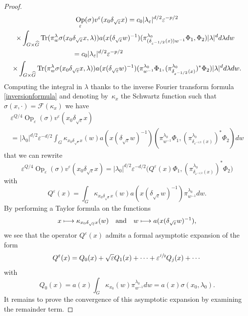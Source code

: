 \documentclass[JEP,XML,SOM,Unicode,published]{cedram}
\let\mathcal\mathscr
\newcommand\mto{\mathchoice{\longmapsto}{\mapsto}{\mapsto}{\mapsto}}
\DeclareMathOperator{\Op}{Op}
\DeclareMathOperator{\Tr}{Tr}
\theoremstyle{plain}
\theoremstyle{definition}
\let\eps\varepsilon
\begin{document}
\begin{proof}
\begin{multline*}
\Op_\eps(\sigma) v^\eps(x_0\delta_{\sqrt\eps}x)
= c_0 |\lambda_\eps|^{d/2}\eps^{-p/2} \\
\shoveright{\times \int_{G\times \widehat G} \Tr (\pi^{\lambda}_{w }\sigma(x_0\delta_{\sqrt\eps} x,\lambda))
a(x (\delta_{\sqrt\eps} w)^{-1}) (\pi_{ (\delta_{\eps^{-1/2}} (x))w^{-1} }^{\lambda_0} \Phi_1, \Phi_2) |\lambda|^d d\lambda dw}\\
\shoveleft{\hphantom{\Op_\eps(\sigma) v^\eps(x_0\delta_{\sqrt\eps}x)}\, =c_0 |\lambda_\eps|^{d/2}\eps^{-p/2}} \\
\times \int_{G\times \widehat G} \Tr (\pi^{\lambda}_{w }\sigma(x_0\delta_{\sqrt\eps} x,\lambda))
a(x (\delta_{\sqrt\eps} w)^{-1})
(\pi_{ w^{-1} }^{\lambda_0} \Phi_1,
(\pi^{\lambda_0}_{\delta_{\eps^{-1/2} }(x)})^*\Phi_2) |\lambda|^d d\lambda dw.
\end{multline*}
Computing the integral in $\lambda$ thanks to the inverse Fourier transform formula \eqref{inversionformula} and denoting by~$\kappa_x$ the Schwartz function such that $\sigma(x,\cdot)=
\mathcal F(\kappa_x)$ we have
\begin{multline*}
\eps^{Q/4} \Op_\eps(\sigma) v^\eps(x_0\delta_{\sqrt\eps}x)\\
= |\lambda_0|^{d/2}\eps^{-d/2} \int_{G} \kappa_{x_0\delta_{\sqrt\eps} x}(w)
a(x (\delta_{\sqrt\eps} w)^{-1})
(\pi_{ w^{-1} }^{\lambda_0} \Phi_1,
(\pi^{\lambda_0}_{\delta_{\eps^{-1/2} }(x)})^*\Phi_2) dw
\end{multline*}
that we can rewrite
\[
\eps^{Q/4} \Op_\eps(\sigma) v^\eps(x_0\delta_{\sqrt\eps}x)
= |\lambda_0|^{d/2}\eps^{-d/2} \bigl(Q^\eps(x) \Phi_1,
(\pi^{\lambda_0}_{\delta_{\eps^{-1/2} }(x)})^*\Phi_2\bigr)
\]
with
\[
Q^\eps(x)=
\int_{G} \kappa_{x_0\delta_{\sqrt\eps} x}(w)
a(x (\delta_{\sqrt\eps} w)^{-1})
\pi_{ w^{-1} }^{\lambda_0} dw.
\]
By performing a Taylor formula on the functions
\[
x\mto \kappa_{x_0\delta_{\sqrt\eps} x}(w)\quad\text{and}\quad w \mto a(x (\delta_{\sqrt\eps} w)^{-1}) ,
\]
we see that the operator $Q^\eps(x)$ admits a formal asymptotic expansion of the form
\begin{equation}\label{expansion:Q}
Q^\eps(x)= Q_0(x)+\sqrt\eps Q_1(x) + \cdots +\eps^{\sfrac j 2} Q_j(x) +\cdots
\end{equation}
with
\[
Q_0(x)= a(x) \int_{G} \kappa_{x_0}(w)
\pi_{ w^{-1} }^{\lambda_0} dw=a(x) \sigma(x_0,\lambda_0).
\]
It remains to prove the convergence of this asymptotic expansion by examining the remainder term.


\end{proof}
\end{document}
